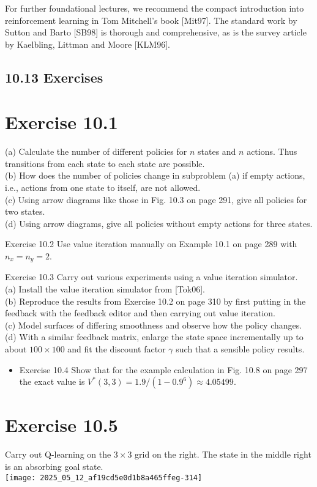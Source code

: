 \documentclass[10pt]{article}
\begin{document}
For further foundational lectures, we recommend the compact introduction into reinforcement learning in Tom Mitchell's book [Mit97]. The standard work by Sutton and Barto [SB98] is thorough and comprehensive, as is the survey article by Kaelbling, Littman and Moore [KLM96].

\subsection*{10.13 Exercises}
\section*{Exercise 10.1}
(a) Calculate the number of different policies for $n$ states and $n$ actions. Thus transitions from each state to each state are possible.\\
(b) How does the number of policies change in subproblem (a) if empty actions, i.e., actions from one state to itself, are not allowed.\\
(c) Using arrow diagrams like those in Fig. 10.3 on page 291, give all policies for two states.\\
(d) Using arrow diagrams, give all policies without empty actions for three states.

Exercise 10.2 Use value iteration manually on Example 10.1 on page 289 with $n_{x}=n_{y}=2$.

Exercise 10.3 Carry out various experiments using a value iteration simulator.\\[0pt]
(a) Install the value iteration simulator from [Tok06].\\
(b) Reproduce the results from Exercise 10.2 on page 310 by first putting in the feedback with the feedback editor and then carrying out value iteration.\\
(c) Model surfaces of differing smoothness and observe how the policy changes.\\
(d) With a similar feedback matrix, enlarge the state space incrementally up to about $100 \times 100$ and fit the discount factor $\gamma$ such that a sensible policy results.

\begin{itemize}
  \item Exercise 10.4 Show that for the example calculation in Fig. 10.8 on page 297 the exact value is $V^{*}(3,3)=1.9 /\left(1-0.9^{6}\right) \approx 4.05499$.
\end{itemize}

\section*{Exercise 10.5}
Carry out Q-learning on the $3 \times 3$ grid on the right. The state in the middle right is an absorbing goal state.\\
\texttt{[image: 2025\_05\_12\_af19cd5e0d1b8a465ffeg-314]}
\end{document}
